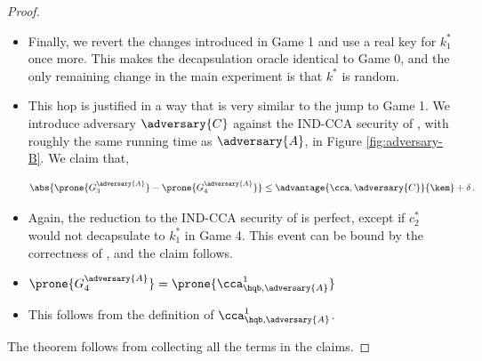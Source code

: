 \begin{proof}
                    \begin{itemize}
                    \item[\textbf{Game 4}]
                        Finally, we revert the changes introduced in Game 1 and use a real
                        key for $k_1^*$ once more.
                        This makes the decapsulation oracle identical to Game 0, and the only remaining change in the main experiment is that $k^*$ is random.
                    \item[\emph{Claim 4}]
                        This hop is justified in a way that is very similar to the jump to Game 1.
                        We introduce adversary $\adversary{C}$ against the IND-CCA security of \kem, with roughly the same running time as $\adversary{A}$, in Figure \ref{fig:adversary-B}.
                        We claim that,

                        \[
                            \abs{\prone{G^{\adversary{A}}_3} - \prone{G^{\adversary{A}}_4}} \leq \advantage{\cca, \adversary{C}}{\kem} + \delta \, .
                        \]

                    \item[\emph{Proof}]
                        Again, the reduction to the IND-CCA security of \kem is perfect, except if $c_2^*$ would not decapsulate to $k_1^*$ in Game 4.
                        This event can be bound by the correctness of \kem, and the claim follows.
                    \item[\emph{Claim 5}]
                        $\prone{G^{\adversary{A}}_4} = \prone{\cca^1_{\hqb, \adversary{A}}}$
                    \item[\emph{Proof}]
                        This follows from the definition of $\cca^1_{\hqb, \adversary{A}}$.

                    \end{itemize}

                    The theorem follows from collecting all the terms in the claims.


\end{proof}
